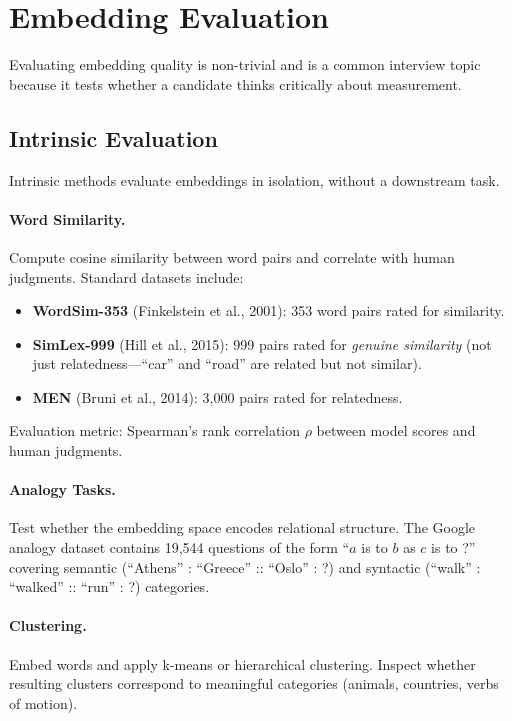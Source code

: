 \section{Embedding Evaluation}
\label{sec:embedding_evaluation}

Evaluating embedding quality is non-trivial and is a common interview topic
because it tests whether a candidate thinks critically about measurement.

\subsection{Intrinsic Evaluation}

Intrinsic methods evaluate embeddings in isolation, without a downstream task.

\paragraph{Word Similarity.}
Compute cosine similarity between word pairs and correlate with human
judgments.  Standard datasets include:
\begin{itemize}
    \item \textbf{WordSim-353} (Finkelstein et al., 2001): 353 word pairs
    rated for similarity.
    \item \textbf{SimLex-999} (Hill et al., 2015): 999 pairs rated for
    \emph{genuine similarity} (not just relatedness---``car'' and ``road''
    are related but not similar).
    \item \textbf{MEN} (Bruni et al., 2014): 3,000 pairs rated for
    relatedness.
\end{itemize}
Evaluation metric: Spearman's rank correlation $\rho$ between model scores
and human judgments.

\paragraph{Analogy Tasks.}
Test whether the embedding space encodes relational structure.  The Google
analogy dataset contains 19,544 questions of the form ``$a$ is to $b$ as $c$
is to ?''  covering semantic (``Athens'' : ``Greece'' :: ``Oslo'' : ?) and
syntactic (``walk'' : ``walked'' :: ``run'' : ?) categories.

\paragraph{Clustering.}
Embed words and apply k-means or hierarchical clustering.  Inspect whether
resulting clusters correspond to meaningful categories (animals, countries,
verbs of motion).

